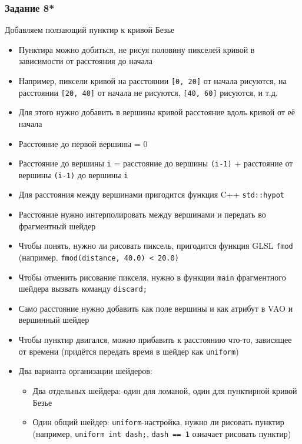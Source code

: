 \documentclass{beamer}
\begin{document}
\begin{frame}[fragile]
\frametitle{Задание 8*}
\fontsize{8pt}{8pt}\selectfont
Добавляем ползающий пунктир к кривой Безье
\begin{itemize}
\item Пунктира можно добиться, не рисуя половину пикселей кривой в зависимости от расстояния до начала
\pause
\item Например, пиксели кривой на расстоянии \verb|[0, 20]| от начала рисуются, на расстоянии \verb|[20, 40]| от начала не рисуются, \verb|[40, 60]| рисуются, и т.д.
\pause
\item Для этого нужно добавить в вершины кривой расстояние вдоль кривой от её начала
\item Расстояние до первой вершины = 0
\item Расстояние до  вершины \verb|i| = расстояние до  вершины \verb|(i-1)| + расстояние от вершины \verb|(i-1)| до вершины \verb|i|
\item Для расстояния между вершинами пригодится функция C++ \verb|std::hypot|
\pause
\item Расстояние нужно интерполировать между вершинами и передать во фрагментный шейдер
\item Чтобы понять, нужно ли рисовать пиксель, пригодится функция GLSL \verb|fmod| (например, \verb|fmod(distance, 40.0) < 20.0)|
\item Чтобы отменить рисование пикселя, нужно в функции \verb|main| фрагментного шейдера вызвать команду \verb|discard;|
\pause
\item Само расстояние нужно добавить как поле вершины и как атрибут в VAO и вершинный шейдер
\pause
\item Чтобы пунктир двигался, можно прибавить к расстоянию что-то, зависящее от времени (придётся передать время в шейдер как \verb|uniform|)
\pause
\item Два варианта организации шейдеров:
\begin{itemize}
\item Два отдельных шейдера: один для ломаной, один для пунктирной кривой Безье
\item Один общий шейдер: \verb|uniform|-настройка, нужно ли рисовать пунктир (например, \verb|uniform int dash;|, \verb|dash == 1| означает рисовать пунктир)
\end{itemize}
\end{itemize}
\end{frame}
\end{document}
